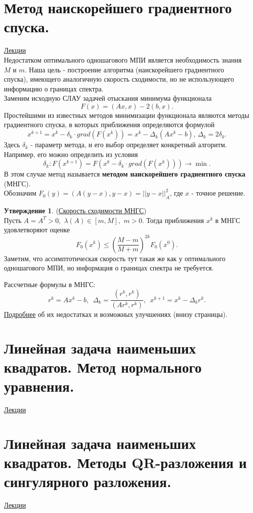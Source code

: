 \documentclass[specialist, subf, href, colorlinks=true, 12pt, times, mtpro, final]{disser}
\theoremstyle{definition}
\newtheorem{state}{Утверждение}[section]
\begin{document}
\section {Метод наискорейшего градиентного спуска.}
	\hyperlink {lects.68}{Лекции}\\
	Недостатком оптимального одношагового МПИ является необходимость знания $M$ и $m$.
	Наша цель - построение алгоритма (наискорейшего градиентного спуска), имеющего
	аналогичную скорость сходимости, но не использующего информацию о границах спектра.\\
	Заменим исходную СЛАУ задачей отыскания минимума функционала
	$$
	   F(x) = (Ax, x) - 2(b,x).
    $$
    Простейшими из известных методов минимизации функционала являются методы градиентного
    спуска, в которых приближения определяются формулой
    $$
        x^{k+1} = x^k - \delta_k\cdot grad(F(x^k)) = x^k - \Delta_k (Ax^k - b), \,
        \Delta_k = 2\delta_k.
    $$
    Здесь $\delta_k$ - параметр метода, и его выбор определяет конкретный алгоритм.
    Например, его можно определить из условия
    $$
        \delta_k: F(x^{k+1}) = F(x^k - \delta_k\cdot grad(F(x^k))) \rightarrow \min.
    $$
    В этом случае метод называется {\bf методом наискорейшего градиентного спуска} (МНГС).\\
    Обозначим $F_0(y) = (A(y-x), y-x) = ||y-x||_A^2$, где $x$ - точное решение.
    \begin{state} (\hyperlink {lects.69}{Скорость сходимости МНГС})\\
	Пусть $A = A^T > 0, \,\, \lambda(A) \in [m, M], \,\, m > 0$. Тогда приближения $x^k$
	в МНГС удовлетворяют оценке
	$$
	    F_0(x^k) \le \left(\frac{M-m}{M+m}\right)^{2k}F_0(x^0).
	$$
	Заметим, что ассимптотическая скорость тут такая же как у оптимального одношагового МПИ,
	но информация о границах спектра не требуется.
	\end{state}
	Рассчетные формулы в МНГС:
	$$
	    r^k = Ax^k - b,\,\,\, \Delta_k = \frac{(r^k, r^k)}{(Ar^k, r^k)}, \,\,\,
	    x^{k+1} = x^k - \Delta_k r^{k}.
	$$
	\hyperlink {lects.70}{Подробнее} об их недостатках и возможных улучшениях
	(внизу страницы).

\section {Линейная задача наименьших квадратов. Метод нормального уравнения.}
	\hyperlink {lects.71}{Лекции}\\

\section {Линейная задача наименьших квадратов. Методы QR-разложения и сингулярного разложения.}
	\hyperlink {lects.72}{Лекции}\\
\end{document}

